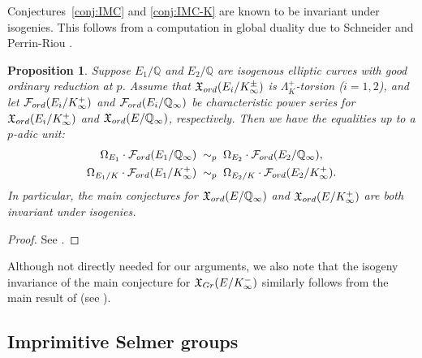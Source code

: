 \documentclass[a4paper,10pt]{amsart}
\numberwithin{equation}{section}
\numberwithin{equation}{section}
\theoremstyle{plain}
\theoremstyle{definition}
\theoremstyle{definition}
\theoremstyle{plain}
\newtheorem{prop}[thm]{Proposition}
\theoremstyle{plain}
\theoremstyle{plain}
\theoremstyle{plain}
\newcommand{\Q}{\mathbb{Q}}
\newcommand{\X}{\mathfrak{X}}
\newcommand{\Fcal}{\mathcal{F}}
\begin{document}
Conjectures~\ref{conj:IMC} and \ref{conj:IMC-K} are known to be invariant under isogenies. This follows from a computation in global duality due to Schneider and Perrin-Riou \cite{schneider-isogenies,perrinriou}. 



\begin{prop}\label{prop:isog-inv}
Suppose $E_1/\Q$ and $E_2/\Q$ are isogenous elliptic curves with good ordinary reduction at $p$. Assume that $\mathfrak{X}_{\rm ord}(E_i/K_\infty^\pm)$ is $\Lambda_K^+$-torsion ($i=1,2$), and let $\mathcal{F}_{\rm ord}(E_i/K_\infty^+)$ and $\mathcal{F}_{\rm ord}(E_i/\Q_\infty)$ be characteristic power series for $\mathfrak{X}_{\rm ord}(E_i/K_\infty^+)$ and $\mathfrak{X}_{\rm ord}(E/\Q_\infty)$, respectively. Then we have the equalities up to a $p$-adic unit:
\begin{align*}
\Omega_{E_1}\cdot\Fcal_{\rm ord}(E_1/\Q_\infty)&\;\sim_p\;\Omega_{E_2}\cdot\Fcal_{\rm ord}(E_2/\Q_\infty),\\
\Omega_{E_1/K}\cdot\Fcal_{\rm ord}(E_1/K_\infty^+)&\;\sim_p\;\Omega_{E_2/K}\cdot\Fcal_{\rm ord}(E_2/K_\infty^+).
\end{align*} 
In particular, the main conjectures for $\mathfrak{X}_{\rm ord}(E/\Q_\infty)$ and $\mathfrak{X}_{\rm ord}(E/K_{\infty}^+)$ are both invariant under isogenies.
\end{prop}

\begin{proof}
See \cite[Appendice]{perrinriou}.
\end{proof}

Although not directly needed for our arguments, we also note that the isogeny invariance of the main conjecture for $\mathfrak{X}_{\rm Gr}(E/K_\infty^-)$ similarly follows from the main result of \cite{PR-isogenies} (see \cite[Prop.\,2.9]{KO-iwasawa}).


\subsection{Imprimitive Selmer groups}\label{subsec:imp}
\end{document}
